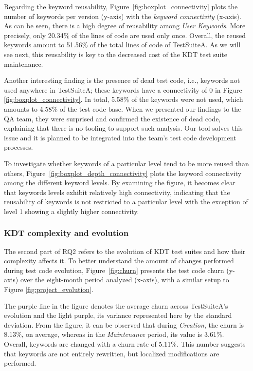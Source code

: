 Regarding the keyword reusability, Figure~\ref{fig:boxplot_connectivity} plots the number of keywords per version (y-axis) with the \emph{keyword connectivity} (x-axis). As can be seen, there is a high degree of reusability among \emph{User Keywords}. More precisely, only 20.34\% of the lines of code are used only once. Overall, the reused keywords amount to 51.56\% of the total lines of code of TestSuiteA. As we will see next, this reusability is key to the decreased cost of the KDT test suite maintenance.

Another interesting finding is the presence of dead test code, i.e., keywords not used anywhere in TestSuiteA; these keywords have a connectivity of 0 in Figure \ref{fig:boxplot_connectivity}. In total, 5.58\% of the keywords were not used, which amounts to 4.58\% of the test code base. When we presented our findings to the QA team, they were surprised and confirmed the existence of dead code, explaining that there is no tooling to support such analysis. Our tool solves this issue and it is planned to be integrated into the team's test code development processes.

To investigate whether keywords of a particular level tend to be more reused than others, Figure~\ref{fig:boxplot_depth_connectivity} plots the keyword connectivity among the different keyword levels. By examining the figure, it becomes clear that keywords levels exhibit relatively high connectivity, indicating that the reusability of keywords is not restricted to a particular level with the exception of level 1 showing a slightly higher connectivity.



\subsubsection{KDT complexity and evolution}
\label{sec:kdt-compl-evol}

The second part of RQ2 refers to the evolution of KDT test suites and how their complexity affects it. To better understand the amount of changes performed during test code evolution, Figure~\ref{fig:churn} presents the test code churn (y-axis) over the eight-month period analyzed (x-axis), with a similar setup to Figure \ref{fig:project_evolution}.

The purple line in the figure denotes the average churn across TestSuiteA's evolution and the light purple, its variance represented here by the standard deviation. From the figure, it can be observed that during \emph{Creation}, the churn is 8.13\%, on average, whereas in the \emph{Maintenance} period, its value is 3.61\%. Overall, keywords are changed with a churn rate of 5.11\%. This number suggests that keywords are not entirely rewritten, but localized modifications are performed.

